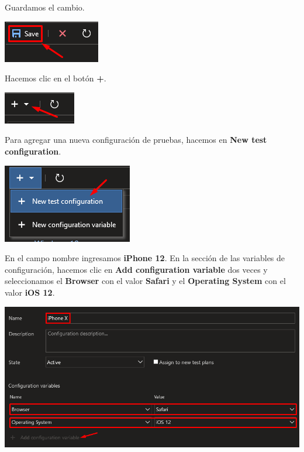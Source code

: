 \documentclass{elsarticle}
\begin{document}
Guardamos el cambio.
\begin{center}
	\includegraphics{img/Screenshot_37.png}
\end{center}

Hacemos clic en el botón \textbf{+}.
\begin{center}
	\includegraphics{img/Screenshot_38.png}
\end{center}

Para agregar una nueva configuración de pruebas, hacemos en \textbf{New test configuration}.
\begin{center}
	\includegraphics{img/Screenshot_39.png}
\end{center}

En el campo nombre ingresamos \textbf{iPhone 12}. En la sección de las variables de configuración, hacemos clic en \textbf{Add configuration variable} dos veces y seleccionamos el \textbf{Browser} con el valor \textbf{Safari} y el \textbf{Operating System} con el valor \textbf{iOS 12}.
\begin{center}
	\includegraphics[width=\columnwidth]{img/Screenshot_40.png}
\end{center}
\end{document}
